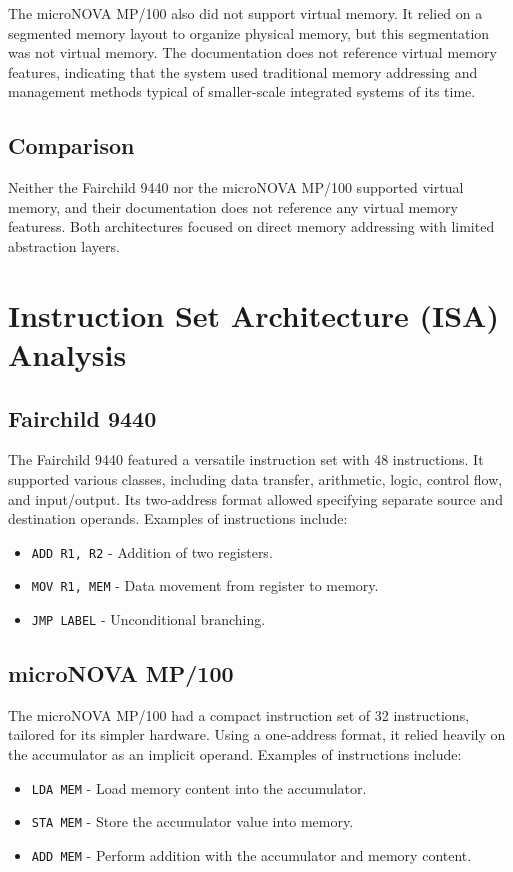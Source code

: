 \documentclass[a4paper,12pt]{article}
\begin{document}
The microNOVA MP/100 also did not support virtual memory. It relied on a segmented memory layout to organize physical memory, but this segmentation was not virtual memory. The documentation does not reference virtual memory features, indicating that the system used traditional memory addressing and management methods typical of smaller-scale integrated systems of its time.

\subsection{Comparison}

Neither the Fairchild 9440 nor the microNOVA MP/100 supported virtual memory, and their documentation does not reference any virtual memory featuress. Both architectures focused on direct memory addressing with limited abstraction layers.


\section{Instruction Set Architecture (ISA) Analysis}

\subsection{Fairchild 9440}

The Fairchild 9440 featured a versatile instruction set with 48 instructions. It supported various classes, including data transfer, arithmetic, logic, control flow, and input/output. Its two-address format allowed specifying separate source and destination operands. Examples of instructions include:
\begin{itemize}
    \item \texttt{ADD R1, R2} - Addition of two registers.
    \item \texttt{MOV R1, MEM} - Data movement from register to memory.
    \item \texttt{JMP LABEL} - Unconditional branching.
\end{itemize}

\subsection{microNOVA MP/100}

The microNOVA MP/100 had a compact instruction set of 32 instructions, tailored for its simpler hardware. Using a one-address format, it relied heavily on the accumulator as an implicit operand. Examples of instructions include:
\begin{itemize}
    \item \texttt{LDA MEM} - Load memory content into the accumulator.
    \item \texttt{STA MEM} - Store the accumulator value into memory.
    \item \texttt{ADD MEM} - Perform addition with the accumulator and memory content.
\end{itemize}
\end{document}

